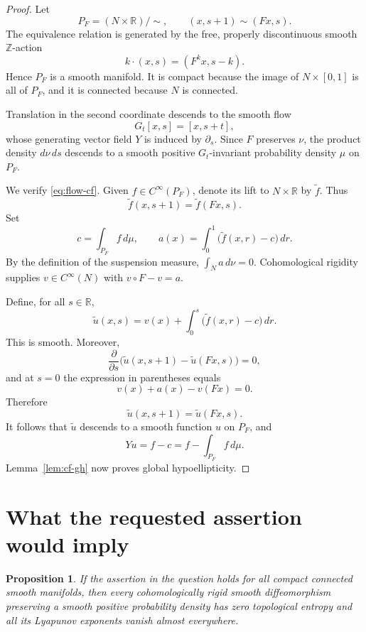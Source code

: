 \documentclass[11pt]{article}
\newtheorem{proposition}[lemma]{Proposition}
\theoremstyle{definition}
\theoremstyle{remark}
\newcommand{\R}{\mathbb{R}}
\begin{document}
\begin{proof}
Let
\[
 P_F=(N\times\R)/{\sim},
 \qquad
 (x,s+1)\sim(Fx,s).
\]
The equivalence relation is generated by the free, properly
discontinuous smooth $\mathbb Z$-action
\[
 k\cdot(x,s)=(F^k x,s-k).
\]
Hence $P_F$ is a smooth manifold. It is compact because the image of
$N\times[0,1]$ is all of $P_F$, and it is connected because $N$ is
connected.

Translation in the second coordinate descends to the smooth flow
\[
 G_t[x,s]=[x,s+t],
\]
whose generating vector field $Y$ is induced by $\partial_s$.
Since $F$ preserves $\nu$, the product density $d\nu\,ds$ descends to
a smooth positive $G_t$-invariant probability density $\mu$ on $P_F$.

We verify \eqref{eq:flow-cf}. Given $f\in C^\infty(P_F)$, denote its
lift to $N\times\R$ by $\widetilde f$. Thus
\[
 \widetilde f(x,s+1)=\widetilde f(Fx,s).
\]
Set
\[
 c=\int_{P_F}f\,d\mu,
 \qquad
 a(x)=\int_0^1\bigl(\widetilde f(x,r)-c\bigr)\,dr.
\]
By the definition of the suspension measure,
$\int_N a\,d\nu=0$. Cohomological rigidity supplies
$v\in C^\infty(N)$ with $v\circ F-v=a$.

Define, for all $s\in\R$,
\[
 \widetilde u(x,s)
 =
 v(x)+\int_0^s\bigl(\widetilde f(x,r)-c\bigr)\,dr.
\]
This is smooth. Moreover,
\[
 \frac{\partial}{\partial s}
 \bigl(\widetilde u(x,s+1)-\widetilde u(Fx,s)\bigr)=0,
\]
and at $s=0$ the expression in parentheses equals
\[
 v(x)+a(x)-v(Fx)=0.
\]
Therefore
\[
 \widetilde u(x,s+1)=\widetilde u(Fx,s).
\]
It follows that $\widetilde u$ descends to a smooth function $u$ on
$P_F$, and
\[
 Yu=f-c=f-\int_{P_F}f\,d\mu.
\]
Lemma~\ref{lem:cf-gh} now proves global hypoellipticity.
\end{proof}

\section{What the requested assertion would imply}

\begin{proposition}\label{prop:reduction}
If the assertion in the question holds for all compact connected smooth
manifolds, then every cohomologically rigid smooth diffeomorphism
preserving a smooth positive probability density has zero topological
entropy and all its Lyapunov exponents vanish almost everywhere.
\end{proposition}
\end{document}
